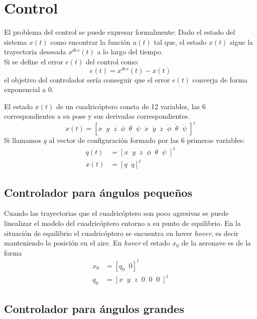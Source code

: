 \chapter{Control}


El problema del control se puede expresar formalmente: 
Dado el estado del sistema $x(t)$ 
como encontrar la función $u(t)$ tal que, el estado $x(t)$ sigue la trayectoria desesada $x^{des}(t)$ a lo largo del tiempo.\\
Si se define el error $e(t)$ del control como:
\begin{equation}
	e(t) = x^{des}(t) - x(t)
\end{equation}
el objetivo del controlador sería conseguir que el error $e(t)$ converja de forma exponencial a 0.


El estado $x(t)$ de un cuadricóptero consta de 12 variables, las 6 correspondientes a su pose y sus derivadas correspondientes.
\begin{equation}
	x(t) = \left[
	x  \;\;
	y  \;\;
	z  \;\;
	\phi  \;\;
	\theta  \;\;
	\psi  \;\;
	\dot{x}  \;\;
	\dot{y}  \;\;
	\dot{z}  \;\;
	\dot{\phi}  \;\;
	\dot{\theta}  \;\;
	\dot{\psi}\;\right]^t
\end{equation}
Si llamamos $q$ al vector de configuración formado por las 6 primeras variables:
\begin{align}
	q(t) &= \left[
	x  \;\;
	y  \;\;
	z  \;\;
	\phi  \;\;
	\theta  \;\;
	\psi  \;\right]^t\\
	x(t) &= \left[q \;\; \dot{q}\right]^t
\end{align}

\section{Controlador para ángulos pequeños}
Cuando las trayectorias que el cuadricóptero son poco agresivas se puede linealizar el modelo del cuadricóptero entorno a su punto de equilibrio. En la situación de equilibrio el cuadricóptero se encuentra en hover \textit{hover}, es decir manteniendo la posición en el aire. En \textit{hover} el estado $x_0$ de la aeronave es de la forma 
\begin{align}
	x_0 &= [q_0 \;\; 0]^t\nonumber\\
	q_0 &= [x  \;\;y  \;\;z  \;\;0  \;\;0  \;\;0  \;]^t
\end{align}


\section{Controlador para ángulos grandes}





